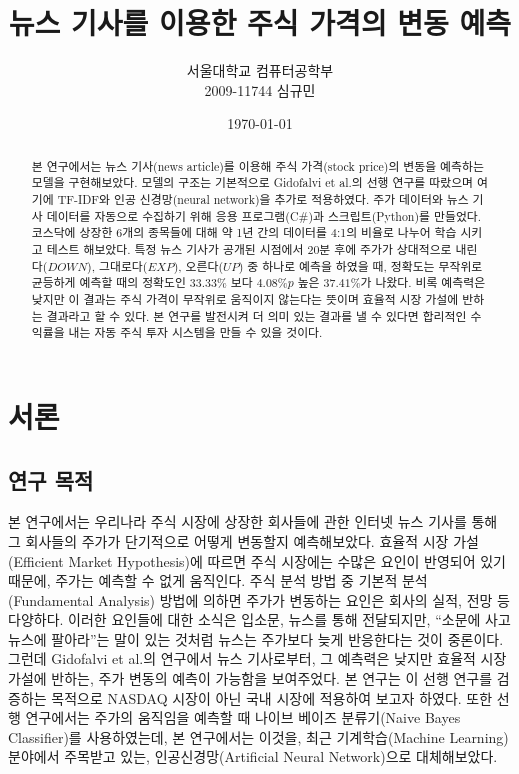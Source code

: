 \documentclass[a4paper,10pt]{article}
\begin{document}
\title{뉴스 기사를 이용한 주식 가격의 변동 예측}
\author{
  서울대학교 컴퓨터공학부 \\
  2009-11744 심규민
}
\date{\koreandate\today}
\maketitle

\begin{abstract}
본 연구에서는 뉴스 기사(news article)를 이용해 주식 가격(stock price)의 변동을 예측하는 모델을 구현해보았다.
모델의 구조는 기본적으로 Gidofalvi et al.의 선행 연구를 따랐으며 여기에 TF-IDF와 인공 신경망(neural network)을 추가로 적용하였다.
주가 데이터와 뉴스 기사 데이터를 자동으로 수집하기 위해 응용 프로그램(C\#)과 스크립트(Python)를 만들었다.
코스닥에 상장한 6개의 종목들에 대해 약 1년 간의 데이터를 4:1의 비율로 나누어 학습 시키고 테스트 해보았다.
특정 뉴스 기사가 공개된 시점에서 20분 후에 주가가 상대적으로 내린다($DOWN$), 그대로다($EXP$), 오른다($UP$) 중 하나로 예측을 하였을 때,
정확도는 무작위로 균등하게 예측할 때의 정확도인 $33.33\%$ 보다 $4.08\%p$ 높은 $37.41\%$가 나왔다.
비록 예측력은 낮지만 이 결과는 주식 가격이 무작위로 움직이지 않는다는 뜻이며 효율적 시장 가설에 반하는 결과라고 할 수 있다.
본 연구를 발전시켜 더 의미 있는 결과를 낼 수 있다면 합리적인 수익률을 내는 자동 주식 투자 시스템을 만들 수 있을 것이다.
\end{abstract}

\tableofcontents

\thispagestyle{empty}
\pagebreak
\setcounter{page}{1}

\section{서론}

\subsection{연구 목적}

본 연구에서는 우리나라 주식 시장에 상장한 회사들에 관한 인터넷 뉴스 기사를 통해 그 회사들의 주가가 단기적으로 어떻게 변동할지 예측해보았다.
효율적 시장 가설(Efficient Market Hypothesis)에 따르면 주식 시장에는 수많은 요인이 반영되어 있기 때문에, 주가는 예측할 수 없게 움직인다.
주식 분석 방법 중 기본적 분석(Fundamental Analysis) 방법에 의하면 주가가 변동하는 요인은 회사의 실적, 전망 등 다양하다.
이러한 요인들에 대한 소식은 입소문, 뉴스를 통해 전달되지만, ``소문에 사고 뉴스에 팔아라''는 말이 있는 것처럼 뉴스는 주가보다 늦게 반응한다는 것이 중론이다.
그런데 Gidofalvi et al.의 연구에서 뉴스 기사로부터, 그 예측력은 낮지만 효율적 시장 가설에 반하는, 주가 변동의 예측이 가능함을 보여주었다.
본 연구는 이 선행 연구를 검증하는 목적으로 NASDAQ 시장이 아닌 국내 시장에 적용하여 보고자 하였다.
또한 선행 연구에서는 주가의 움직임을 예측할 때 나이브 베이즈 분류기(Naive Bayes Classifier)를 사용하였는데,
본 연구에서는 이것을, 최근 기계학습(Machine Learning) 분야에서 주목받고 있는, 인공신경망(Artificial Neural Network)으로 대체해보았다.
\end{document}
